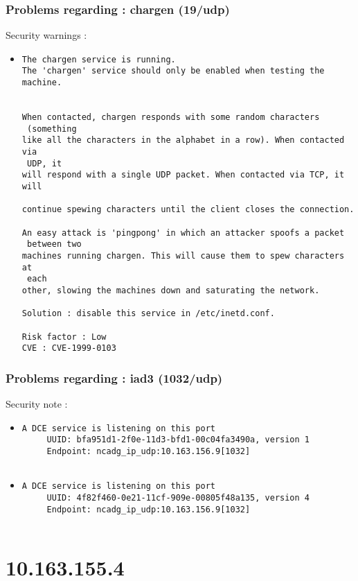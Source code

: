 \documentclass{article}
\begin{document}
\subsubsection{Problems regarding : chargen (19/udp)}
Security warnings :\\
\begin{itemize}
\item \begin{verbatim}
The chargen service is running.
The 'chargen' service should only be enabled when testing the machine.
 

When contacted, chargen responds with some random characters
 (something
like all the characters in the alphabet in a row). When contacted via
 UDP, it 
will respond with a single UDP packet. When contacted via TCP, it will
 
continue spewing characters until the client closes the connection. 

An easy attack is 'pingpong' in which an attacker spoofs a packet
 between two
machines running chargen. This will cause them to spew characters at
 each 
other, slowing the machines down and saturating the network.
      
Solution : disable this service in /etc/inetd.conf.

Risk factor : Low
CVE : CVE-1999-0103
\end{verbatim}\end{itemize}
\subsubsection{Problems regarding : iad3 (1032/udp)}
Security note :\\
\begin{itemize}
\item \begin{verbatim}
A DCE service is listening on this port
     UUID: bfa951d1-2f0e-11d3-bfd1-00c04fa3490a, version 1
     Endpoint: ncadg_ip_udp:10.163.156.9[1032]


\end{verbatim}\item \begin{verbatim}
A DCE service is listening on this port
     UUID: 4f82f460-0e21-11cf-909e-00805f48a135, version 4
     Endpoint: ncadg_ip_udp:10.163.156.9[1032]


\end{verbatim}\end{itemize}
\newpage
\section{10.163.155.4}
\end{document}
